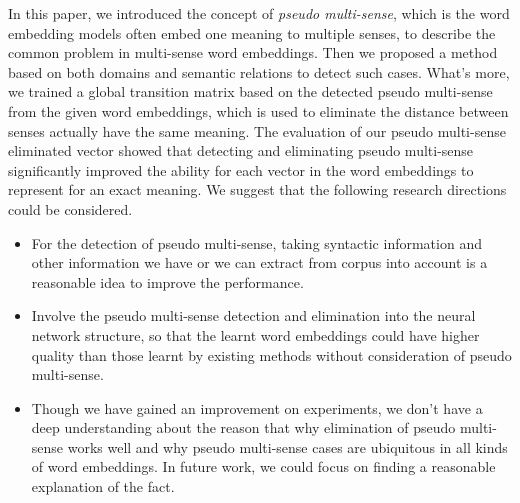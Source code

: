 \documentclass[11pt]{article}
\begin{document}
\par
In this paper, we introduced the concept of {\sl pseudo multi-sense}, which is the word embedding models often embed one meaning to multiple senses, to describe the common problem in multi-sense word embeddings. Then we proposed a method based on both domains and semantic relations to detect such cases. What's more, we trained a global transition matrix based on the detected pseudo multi-sense from the given word embeddings, which is used to eliminate the distance between senses actually have the same meaning. The evaluation of our pseudo multi-sense eliminated vector showed that detecting and eliminating pseudo multi-sense significantly improved the ability for each vector in the word embeddings to represent for an exact meaning. We suggest that the following research directions could be considered.%
\begin{itemize}
\item For the detection of pseudo multi-sense, taking syntactic information and other information we have or we can extract from corpus into account is a reasonable idea to improve the performance.
\item Involve the pseudo multi-sense detection and elimination into the neural network structure, so that the learnt word embeddings could have higher quality than those learnt by existing methods without consideration of pseudo multi-sense.
\item Though we have gained an improvement on experiments, we don't have a deep understanding about the reason that why elimination of pseudo multi-sense works well and why pseudo multi-sense cases are ubiquitous in all kinds of word embeddings. In future work, we could focus on finding a reasonable explanation of the fact.
\end{itemize}


\newpage

\end{document}
